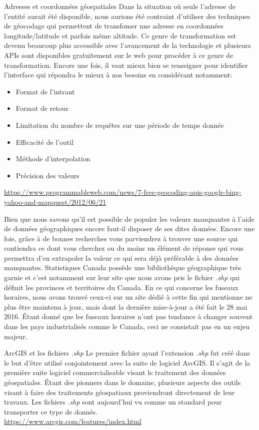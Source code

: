 \begin{moreInfo}{Adresses et coordonnées géospatiales}
	Dans la situation où seule l'adresse de l'entité aurait été disponible, nous aurions été contraint d'utiliser des techniques de géocodage qui permettent de transfomer une adresse en coordonnées longitude/latitude et parfois même altitude. Ce genre de transformation est devenu beaucoup plus accessible avec l'avancement de la technologie et plusieurs APIs sont disponibles gratuitement sur le web pour procéder à ce genre de transformation. Encore une fois, il vaut mieux bien se renseigner pour identifier l'interface qui répondra le mieux à nos besoins en considérant notamment:
	\begin{itemize}
		\item Format de l'intrant
		\item Format de retour
		\item Limitation du nombre de requêtes sur une période de temps donnée
		\item Efficacité de l'outil
		\item Méthode d'interpolation
		\item Précision des valeurs
	\end{itemize}
	\url{https://www.programmableweb.com/news/7-free-geocoding-apis-google-bing-yahoo-and-mapquest/2012/06/21}
\end{moreInfo}

\noindent
Bien que nous savons qu'il est possible de populer les valeurs manquantes à l'aide de données géographiques encore faut-il disposer de ses dites données. Encore une fois, grâce à de bonnes recherches vous parviendrez à trouver une source qui contiendra ce dont vous cherchez ou du moins un élément de réponse qui vous permettra d'en extrapoler la valeur ce qui sera déjà préférable à des données manquantes. Statistiques Canada possède une bibliothèque géographique très garnie et c'est notamment sur leur site que nous avons pris le fichier \emph{.shp} qui définit les provinces et territoires du Canada. \cite{Data:BoundaryFiles} En ce qui concerne les fuseaux horaires, nous avons trouvé ceux-ci sur un site dédié à cette fin qui mentionne ne plus être maintenu à jour, mais dont la dernière mise-à-jour a été fait le 28 mai 2016. Étant donné que les fuseaux horaires n'ont pas tendance à changer souvent dans les pays industrialisés comme le Canada, ceci ne consistait pas en un enjeu majeur. \cite{Data:tzWorlwide} \\

\begin{moreInfo}{ArcGIS et les fichiers \emph{.shp}}
	Le premier fichier ayant l'extension \emph{.shp} fut créé dans le but d'être utilisé conjointement avec la suite de logiciel ArcGIS. Il s'agit de la première suite logiciel commercialisable visant le traitement des données géospatiales. Étant des pionners dans le domaine, plusieurs aspects des outils visant à faire des traitements géospatiaux proviendront directement de leur travaux. Les fichiers \emph{.shp} sont aujourd'hui vu comme un standard pour transporter ce type de donnés. \\
\url{https://www.arcgis.com/features/index.html}
\end{moreInfo}

